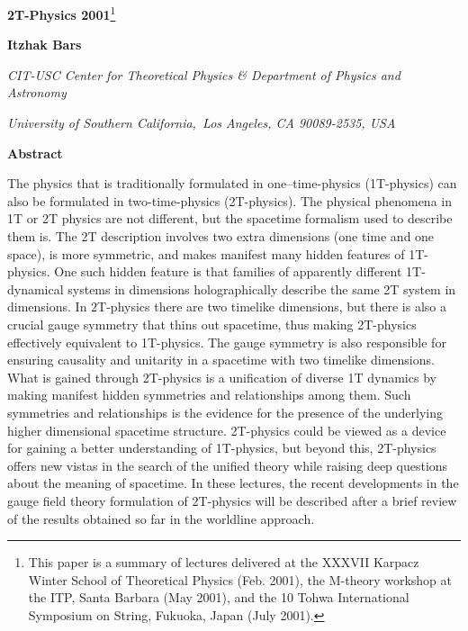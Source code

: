 \documentclass[a4paper,12pt]{article}
\begin{document}

{\vskip1.5cm}

\begin{center}
{\Large \textbf{2T-Physics 2001}}{\footnote{%
This paper is a summary of lectures delivered at the XXXVII
Karpacz Winter School of Theoretical Physics (Feb. 2001), the
M-theory workshop at the ITP, Santa Barbara (May 2001), and the
10\coordHE{} Tohwa International Symposium on String, Fukuoka, Japan
(July 2001).}}

\bigskip

{\vskip0.5cm}

\textbf{Itzhak Bars}

{\vskip0.5cm}

\textsl{CIT-USC Center for Theoretical Physics \& Department of
Physics and Astronomy}

\textsl{University of Southern California,\ Los Angeles, CA
90089-2535, USA}

{\vskip0.5cm}

\textbf{Abstract}
\end{center}

The physics that is traditionally formulated in one--time-physics
(1T-physics) can also be formulated in two-time-physics
(2T-physics). The physical phenomena in 1T or 2T physics are not
different, but the spacetime formalism used to describe them is.
The 2T description involves two extra dimensions (one time and one
space), is more symmetric, and makes manifest many hidden features
of 1T-physics. One such hidden feature is that families of
apparently different 1T-dynamical systems in \coordHE{} dimensions
holographically describe the same 2T system in \coordHE{} dimensions.
In 2T-physics there are two timelike dimensions, but there is also
a crucial gauge symmetry that thins out spacetime, thus making
2T-physics effectively equivalent to 1T-physics. The gauge
symmetry is also responsible for ensuring causality and unitarity
in a spacetime with two timelike dimensions. What is gained
through 2T-physics is a unification of diverse 1T dynamics by
making manifest hidden symmetries and relationships among them.
Such symmetries and relationships is the evidence for the presence
of the underlying higher dimensional spacetime structure.
2T-physics could be viewed as a device for gaining a better
understanding of 1T-physics, but beyond this, 2T-physics offers
new vistas in the search of the unified theory while raising deep
questions about the meaning of spacetime. In these lectures, the
recent developments in the gauge field theory formulation of
2T-physics will be described after a brief review of the results
obtained so far in the worldline approach.
\end{document}
